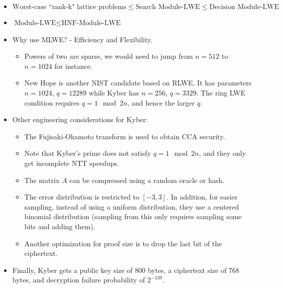 \begin{itemize}
    \item $\text{Worst-case ``rank-k" lattice problems} \leq \text{Search Module-LWE} \leq \text{Decision Module-LWE}$
    \item $\text{Module-LWE} \leq \text{HNF-Module-LWE}$ ~\cite{DCC:LanSte15}
    \item Why use MLWE? - Efficiency and Flexibility.
    \begin{itemize}
        \item Powers of two are sparse, we would need to jump from $n=512$ to $n=1024$ for instance.
        \item New Hope is another NIST candidate based on RLWE. It has parameters $n=1024$, $q=12289$ while Kyber has $n=256$, $q=3329$. The ring LWE condition requires $q = 1 \mod 2n$, and hence the larger $q$. 
    \end{itemize}
    \item Other engineering considerations for Kyber:
    \begin{itemize}
        \item The Fujisaki-Okamoto transform is used to obtain CCA security.
        \item Note that Kyber's prime does not satisfy $q = 1 \mod 2n$, and they only get incomplete NTT speedups.
        \item The matrix $A$ can be compressed using a random oracle or hash.
        \item The error distribution is restricted to $[-3,3]$. In addition, for easier sampling, instead of using a uniform distribution, they use a centered binomial distribution (sampling from this only requires sampling some bits and adding them).
        \item Another optimization for proof size is to drop the last bit of the ciphertext.
    \end{itemize}
    \item Finally, Kyber gets a public key size of $800$ bytes, a ciphertext size of $768$ bytes, and decryption failure probability of $2^{-139}$.
\end{itemize} 